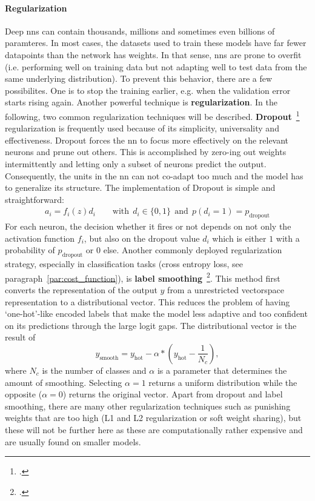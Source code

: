 \paragraph{Regularization}
Deep \gls{nn}s can contain thousands, millions and sometimes even billions of paramteres. In most cases, the datasets used to train these models have far fewer datapoints than the network has weights. In that sense, \gls{nn}s are prone to overfit (i.e. performing well on training data but not adapting well to test data from the same underlying distribution). To prevent this behavior, there are a few possibilites. One is to stop the training earlier, e.g. when the validation error starts rising again. Another powerful technique is \textbf{regularization}. In the following, two common regularization techniques will be described. \textbf{Dropout}~\footcite{JMLR:v15:srivastava14a} regularization is frequently used because of its simplicity, universality and effectiveness. Dropout forces the \gls{nn} to focus more effectively on the relevant neurons and prune out others. This is accomplished by zero-ing out weights intermittently and letting only a subset of neurons predict the output. Consequently, the units in the \gls{nn} can not co-adapt too much and the model has to generalize its structure. The implementation of Dropout is simple and straightforward:
\begin{align}
	a_i = f_i (z) d_i \qquad \text{with} \ \ d_i \in \{0, 1\} \ \ \text{and} \ \ p(d_i = 1) = p_{\text{dropout}}
\end{align}
For each neuron, the decision whether it fires or not depends on not only the activation function $ f_i $, but also on the dropout value $ d_i $ which is either $ 1 $ with a probability of $ p_{\text{dropout}} $ or $ 0 $ else. Another commonly deployed regularization strategy, especially in classification tasks (cross entropy loss, see paragraph~\ref{par:cost_function}), is \textbf{label smoothing}~\footcite{DBLP:journals/corr/abs-1906-02629}. This method first converts the representation of the output $ y $ from a unrestricted vectorspace representation to a distributional vector. This reduces the problem of having `one-hot'-like encoded labels that make the model less adaptive and too confident on its predictions through the large logit gaps. The distributional vector is the result of
\begin{equation}
	y_{\text{smooth}} = y_{\text{hot}} - \alpha * \left( y_{\text{hot}} - \frac{1}{N_c} \right),
\end{equation}
where $ N_c $ is the number of classes and $ \alpha $ is a parameter that determines the amount of smoothing. Selecting $ \alpha = 1 $ returns a uniform distribution while the opposite ($ \alpha = 0 $) returns the original vector. Apart from dropout and label smoothing, there are many other regularization techniques such as punishing weights that are too high (L1 and L2 regularization or soft weight sharing), but these will not be further here as these are computationally rather expensive and are usually found on smaller models.

